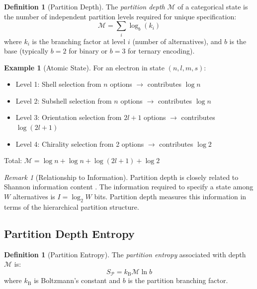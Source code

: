 \documentclass[twocolumn,10pt,a4paper]{article}
\theoremstyle{definition}
\newtheorem{definition}[theorem]{Definition}
\newtheorem{example}[theorem]{Example}
\theoremstyle{remark}
\newtheorem{remark}[theorem]{Remark}
\newcommand{\kB}{k_{\mathrm{B}}}
\newcommand{\Partition}{\mathcal{P}}
\newcommand{\Depth}{\mathcal{M}}
\begin{document}
\begin{definition}[Partition Depth]
\label{def:depth}
The \emph{partition depth} $\Depth$ of a categorical state is the number of independent partition levels required for unique specification:
\begin{equation}
    \Depth = \sum_{i} \log_b(k_i)
\end{equation}
where $k_i$ is the branching factor at level $i$ (number of alternatives), and $b$ is the base (typically $b = 2$ for binary or $b = 3$ for ternary encoding).
\end{definition}

\begin{example}[Atomic State]
For an electron in state $(n, l, m, s)$:
\begin{itemize}
    \item Level 1: Shell selection from $n$ options $\rightarrow$ contributes $\log n$
    \item Level 2: Subshell selection from $n$ options $\rightarrow$ contributes $\log n$
    \item Level 3: Orientation selection from $2l+1$ options $\rightarrow$ contributes $\log(2l+1)$
    \item Level 4: Chirality selection from 2 options $\rightarrow$ contributes $\log 2$
\end{itemize}
Total: $\Depth = \log n + \log n + \log(2l+1) + \log 2$
\end{example}

\begin{remark}[Relationship to Information]
Partition depth is closely related to Shannon information content \cite{shannon1948}. The information required to specify a state among $W$ alternatives is $I = \log_2 W$ bits. Partition depth measures this information in terms of the hierarchical partition structure.
\end{remark}

\subsection{Partition Depth Entropy}

\begin{definition}[Partition Entropy]
\label{def:partition_entropy}
The \emph{partition entropy} associated with depth $\Depth$ is:
\begin{equation}
    S_{\Partition} = \kB \Depth \ln b
\end{equation}
where $\kB$ is Boltzmann's constant and $b$ is the partition branching factor.
\end{definition}
\end{document}
